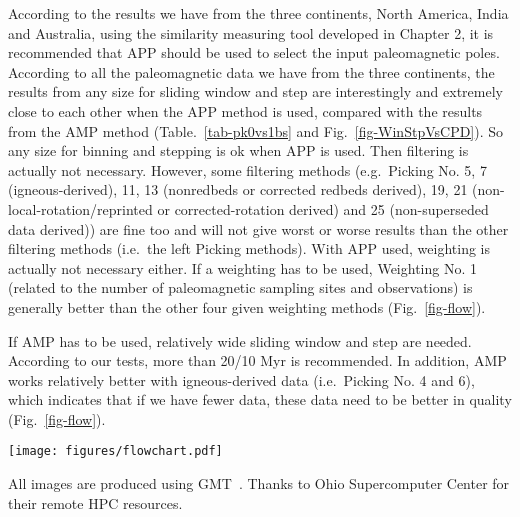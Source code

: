 According to the results we have from the three continents, North America, India
and Australia, using the similarity measuring tool developed in Chapter 2, it is
recommended that APP should be used to select the input paleomagnetic poles.
According to all the paleomagnetic data we have from the three continents, the
results from any size for sliding window and step are interestingly and
extremely close to each other when the APP method is used, compared with the
results from the AMP method (Table.~\ref{tab-pk0vs1bs} and
Fig.~\ref{fig-WinStpVsCPD}). So any size for binning and stepping is ok when
APP is used. Then filtering is actually not necessary. However, some filtering
methods (e.g.\ Picking No. 5, 7 (igneous-derived), 11, 13 (nonredbeds or
corrected redbeds derived), 19, 21 (non-local-rotation/reprinted or
corrected-rotation derived) and 25 (non-superseded data derived)) are fine too
and will not give worst or worse results than the other filtering methods (i.e.\
the left Picking methods). With APP used, weighting is actually not necessary
either. If a weighting has to be used, Weighting No. 1 (related to the number
of paleomagnetic sampling sites and observations) is generally better than the
other four given weighting methods (Fig.~\ref{fig-flow}).

If AMP has to be used, relatively wide sliding window and step are needed.
According to our tests, more than 20/10 Myr is recommended. In addition, AMP
works relatively better with igneous-derived data (i.e.\ Picking No. 4 and 6),
which indicates that if we have fewer data, these data need to be better in
quality (Fig.~\ref{fig-flow}).

\begin{figure*}
\centering
\texttt{[image: figures/flowchart.pdf]}
\caption[Flowchart]{Flowchart for recommended procedure of processing
  paleomagnetic data.}\label{fig-flow}
\end{figure*}

\begin{acknowledgments}
All images are produced using GMT~\cite{W13}. Thanks to Ohio Supercomputer
Center for their remote HPC resources.
\end{acknowledgments}

